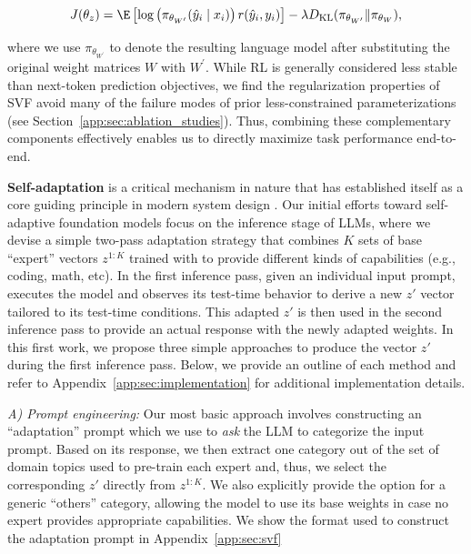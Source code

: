 \begin{equation}
    J(\theta_z) = \E \left[\log\left(\pi_{\theta_{W^\prime}}(\hat{y}_i \mid x_i)\right)r(\hat{y}_i, y_i)\right] - \lambda D_\mathrm{KL}(\pi_{\theta_{W^\prime}} \| \pi_{\theta_{W}}),
\label{eqn:sec3:reinforce}
\end{equation}

where we use $\pi_{\theta_{W^\prime}}$ to denote the resulting language model after substituting the original weight matrices $W$ with $W^\prime$.
While RL is generally considered less stable than next-token prediction objectives, we find the regularization properties of SVF avoid many of the failure modes of prior less-constrained parameterizations (see Section~\ref{app:sec:ablation_studies}).
Thus, combining these complementary components effectively enables us to directly maximize task performance end-to-end.

\textbf{Self-adaptation} is a critical mechanism in nature that has established itself as a core guiding principle in modern system design \citep{7302492}. Our initial efforts toward self-adaptive foundation models focus on the inference stage of LLMs, where we devise a simple two-pass adaptation strategy that combines $K$ sets of base ``expert'' vectors $z^{1:K}$ trained with \svdacro to provide different kinds of capabilities (e.g., coding, math, etc).
In the first inference pass, given an individual input prompt, \implname executes the model and observes its test-time behavior to derive a new $z'$ vector tailored to its test-time conditions. 
This adapted $z'$ is then used in the second inference pass to provide an actual response with the newly adapted weights. 
In this first work, we propose three simple approaches to produce the vector $z'$ during the first inference pass. Below, we provide an outline of each method and refer to Appendix~\ref{app:sec:implementation} for additional implementation details.

\textit{A) Prompt engineering:}
Our most basic approach involves constructing an ``adaptation'' prompt which we use to \textit{ask} the LLM to categorize the input prompt.
Based on its response, we then extract one category out of the set of domain topics used to pre-train each \svdacro expert and, thus, we select the corresponding $z'$ directly from $z^{1:K}$.
We also explicitly provide the option for a generic ``others'' category, allowing the model to use its base weights in case no expert provides appropriate capabilities. We show the format used to construct the adaptation prompt in Appendix~\ref{app:sec:svf}

